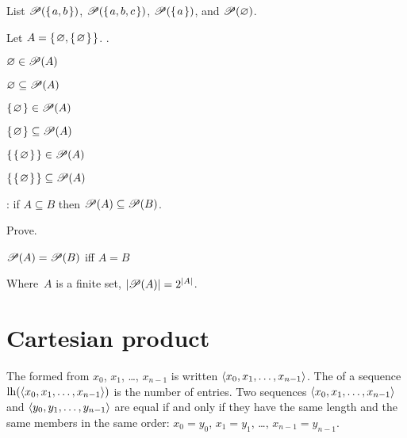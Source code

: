 \documentclass{ibl}
\begin{document}
\begin{ex} List 
 $\mathscr{P}(\mbox{$\{\hspace{0.1em}a,b\hspace{0.1em}\}$})$,   
 $\mathscr{P}(\mbox{$\{\hspace{0.1em}a,b,c\hspace{0.1em}\}$})$,   
 $\mathscr{P}(\mbox{$\{\hspace{0.1em}a\hspace{0.1em}\}$})$, and   
 $\mathscr{P}(\varnothing)$.   
\end{ex}

\begin{ex}  Let $A=\mbox{$\{\hspace{0.1em}\varnothing,\mbox{$\{\hspace{0.1em}\varnothing\hspace{0.1em}\}$}\hspace{0.1em}\}$}$. \pord.
\begin{exes}
\item $\varnothing\in\mathscr{P}(A)$    
\item $\varnothing\subseteq\mathscr{P}(A)$    
\item $\mbox{$\{\hspace{0.1em}\varnothing\hspace{0.1em}\}$}\in\mathscr{P}(A)$    
\item $\mbox{$\{\hspace{0.1em}\varnothing\hspace{0.1em}\}$}\subseteq\mathscr{P}(A)$    
\item $\mbox{$\{\hspace{0.1em}\mbox{$\{\hspace{0.1em}\varnothing\hspace{0.1em}\}$}\hspace{0.1em}\}$}\in\mathscr{P}(A)$    
\item $\mbox{$\{\hspace{0.1em}\mbox{$\{\hspace{0.1em}\varnothing\hspace{0.1em}\}$}\hspace{0.1em}\}$}\subseteq\mathscr{P}(A)$    
\end{exes}
\end{ex}

\begin{ex} \pord:
if $A\subseteq B$ then $\mathscr{P}(A)\subseteq\mathscr{P}(B)$.  
\end{ex}

\begin{ex} Prove.
\begin{exes}
\item $\mathscr{P}(A)=\mathscr{P}(B)$ iff $A= B$  
\item Where~$A$ is a finite set, $|\mathscr{P}(A)|=2^{|A|}$.    
\end{exes}
\end{ex}





\section{Cartesian product}

\begin{df}
The  
formed from $x_0$, $x_1$, \ldots, $x_{n-1}$ is written
$\langle x_0, x_1, \ldots, x_{n-1}\rangle$.
The  of a sequence $\operatorname*{lh}(\langle x_0, x_1, \ldots, x_{n-1}\rangle)$
is the number of entries.
Two sequences $\langle x_0, x_1, \ldots, x_{n-1}\rangle$ and
$\langle y_0, y_1, \ldots, y_{n-1}\rangle$ are equal if and only if
they have the same length and
the same members in the same order:
$x_0=y_0$, $x_1=y_1$, \ldots, $x_{n-1}=y_{n-1}$. 
\end{df}
\end{document}
